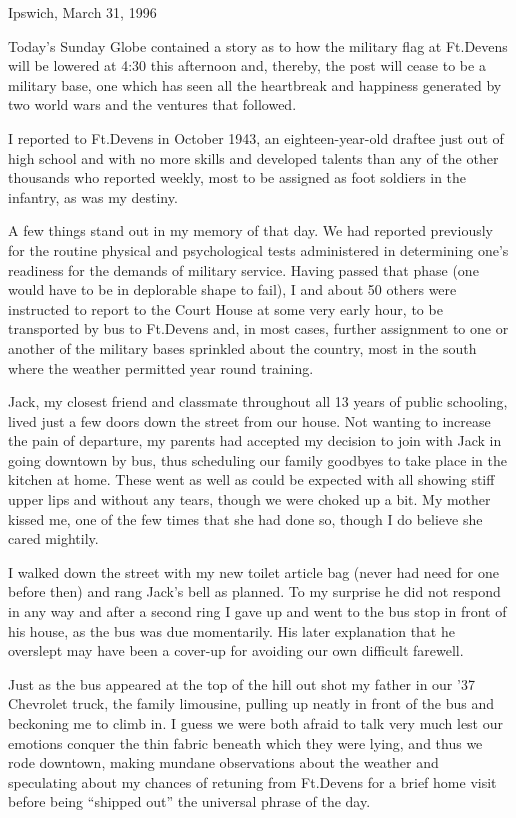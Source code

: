 \documentclass[../m3y]{subfiles}
\begin{document}
\vspace*{-30pt}
\begin{center}\large Ipswich, March 31, 1996\end{center}
Today's Sunday Globe contained a story as to how the military flag at Ft.\@ Devens will be lowered at 4:30 this afternoon and, thereby, the post will cease to be a military base, one which has seen all the heartbreak and happiness generated by two world wars and the ventures that followed.

I reported to Ft.\@ Devens in October 1943, an eighteen-year-old draftee just out of high school and with no more skills and developed talents than any of the other thousands who reported weekly, most to be assigned as foot soldiers in the infantry, as was my destiny.

A few things stand out in my memory of that day. We had reported previously for the routine physical and psychological tests administered in determining one's readiness for the demands of military service. Having passed that phase (one would have to be in deplorable shape to fail), I and about 50 others were instructed to report to the Court House at some very early hour, to be transported by bus to Ft.\@ Devens and, in most cases, further assignment to one or another of the military bases sprinkled about the country, most in the south where the weather permitted year round training.

Jack, my closest friend and classmate throughout all 13 years of public schooling, lived just a few doors down the street from our house. Not wanting to increase the pain of departure, my parents had accepted my decision to join with Jack in going downtown by bus, thus scheduling our family goodbyes to take place in the kitchen at home. These went as well as could be expected with all showing stiff upper lips and without any tears, though we were choked up a bit. My mother kissed me, one of the few times that she had done so, though I do believe she cared mightily.

I walked down the street with my new toilet article bag (never had need for one before then) and rang Jack's bell as planned. To my surprise he did not respond in any way and after a second ring I gave up and went to the bus stop in front of his house, as the bus was due momentarily. His later explanation that he overslept may have been a cover-up for avoiding our own difficult farewell.

Just as the bus appeared at the top of the hill out shot my father in our '37 Chevrolet truck, the family limousine, pulling up neatly in front of the bus and beckoning me to climb in. I guess we were both afraid to talk very much lest our emotions conquer the thin fabric beneath which they were lying, and thus we rode downtown, making mundane observations about the weather and speculating about my chances of retuning from Ft.\@ Devens for a brief home visit before being ``shipped out'' the universal phrase of the day.
\end{document}
